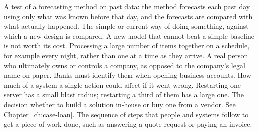 \begin{description}[style=nextline, leftmargin=1.2em, itemsep=4pt, font=\normalfont\bfseries\sffamily\small]
 A test of a forecasting method on past data: the method forecasts each past day using only what was known before that day, and the forecasts are compared with what actually happened.
 The simple or current way of doing something, against which a new design is compared. A new model that cannot beat a simple baseline is not worth its cost.
 Processing a large number of items together on a schedule, for example every night, rather than one at a time as they arrive.
 A real person who ultimately owns or controls a company, as opposed to the company's legal name on paper. Banks must identify them when opening business accounts.
 How much of a system a single action could affect if it went wrong. Restarting one server has a small blast radius; restarting a third of them has a large one.
 The decision whether to build a solution in-house or buy one from a vendor. See Chapter~\ref{ch:case-loan}.
 The sequence of steps that people and systems follow to get a piece of work done, such as answering a quote request or paying an invoice.


\end{description}
